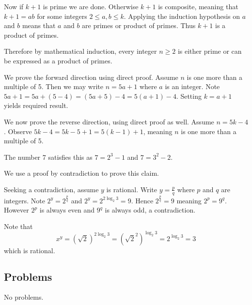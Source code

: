 \begin{questions}
    Now if $k + 1$ is prime we are done. Otherwise $k + 1$ is composite, meaning that $k + 1 = ab$ for some integers $2 \leq a,b \leq k$. Applying the induction hypothesis on $a$ and $b$ means that $a$ and $b$ are primes or product of primes. Thus $k + 1$ is a product of primes.

    Therefore by mathematical induction, every integer $n \geq 2$ is either prime or can be expressed as a product of primes.

    \item We prove the forward direction using direct proof. Assume $n$ is one more than a multiple of 5. Then we may write $n = 5a + 1$ where $a$ is an integer. Note $5a + 1 = 5a + (5 - 4) = (5a + 5) - 4 = 5(a+1) - 4$. Setting $k = a+1$ yields required result.

    We now prove the reverse direction, using direct proof as well. Assume $n = 5k - 4$. Observe $5k - 4 = 5k - 5 + 1 = 5(k-1) + 1$, meaning $n$ is one more than a multiple of 5.

    \item The number 7 satisfies this as $7 = 2^3 - 1$ and $7 = 3^2 - 2$.

    \item \begin{partquestions}{\roman*}
        \item We use a proof by contradiction to prove this claim.

        Seeking a contradiction, assume $y$ is rational. Write $y = \frac pq$ where $p$ and $q$ are integers. Note $2^y = 2^{\frac pq}$ and $2^y = 2^{2\log_2{3}} = 9$. Hence $2^{\frac pq} = 9$ meaning $2^p = 9^q$. However $2^p$ is always even and $9^q$ is always odd, a contradiction.

        \item Note that
        \[
            x^y = (\sqrt2)^{2\log_2{3}} = \left(\sqrt{2}^2\right)^{\log_2{3}} = 2^{\log_2{3}} = 3
        \]
        which is rational.
    \end{partquestions}
\end{questions}

\subsection*{Problems}
No problems.
